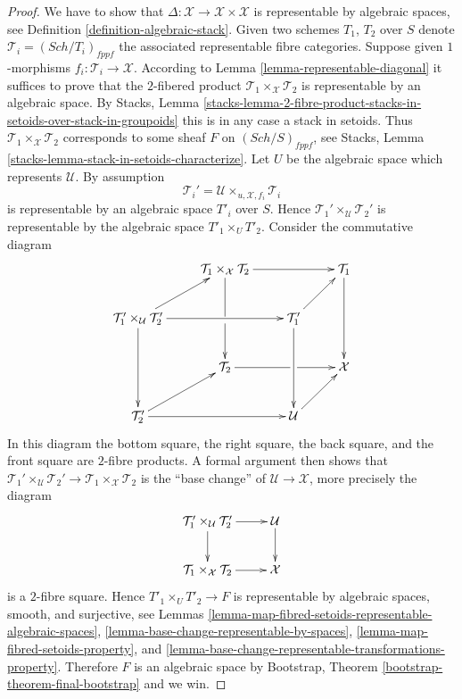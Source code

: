 \documentclass{stacks-project}
\theoremstyle{plain}
\theoremstyle{definition}
\theoremstyle{remark}
\numberwithin{equation}{subsection}
\def\Sch{\mathit{Sch}}
\begin{document}
\begin{proof}
We have to show that $\Delta : \mathcal{X} \to \mathcal{X} \times \mathcal{X}$
is representable by algebraic spaces, see
Definition \ref{definition-algebraic-stack}.
Given two schemes $T_1$, $T_2$ over $S$ denote
$\mathcal{T}_i = (\Sch/T_i)_{fppf}$ the associated representable
fibre categories. Suppose given $1$-morphisms
$f_i : \mathcal{T}_i \to \mathcal{X}$.
According to
Lemma \ref{lemma-representable-diagonal}
it suffices to prove that the $2$-fibered
product $\mathcal{T}_1 \times_\mathcal{X} \mathcal{T}_2$
is representable by an algebraic space. By
Stacks, Lemma
\ref{stacks-lemma-2-fibre-product-stacks-in-setoids-over-stack-in-groupoids}
this is in any case a stack in setoids. Thus
$\mathcal{T}_1 \times_\mathcal{X} \mathcal{T}_2$ corresponds
to some sheaf $F$ on $(\Sch/S)_{fppf}$, see
Stacks, Lemma \ref{stacks-lemma-stack-in-setoids-characterize}.
Let $U$ be the algebraic space which represents $\mathcal{U}$.
By assumption
$$
\mathcal{T}_i' = \mathcal{U} \times_{u, \mathcal{X}, f_i} \mathcal{T}_i
$$
is representable by an algebraic space $T'_i$ over $S$. Hence
$\mathcal{T}_1' \times_\mathcal{U} \mathcal{T}_2'$ is representable
by the algebraic space $T'_1 \times_U T'_2$.
Consider the commutative diagram
$$
\xymatrix{
&
\mathcal{T}_1 \times_{\mathcal X} \mathcal{T}_2 \ar[rr]\ar'[d][dd] & &
\mathcal{T}_1 \ar[dd] \\
\mathcal{T}_1' \times_\mathcal{U} \mathcal{T}_2' \ar[ur]\ar[rr]\ar[dd] & &
\mathcal{T}_1' \ar[ur]\ar[dd] \\
&
\mathcal{T}_2 \ar'[r][rr] & &
\mathcal X \\
\mathcal{T}_2' \ar[rr]\ar[ur] & &
\mathcal{U} \ar[ur] }
$$
In this diagram the bottom square, the right square, the back square, and
the front square are $2$-fibre products. A formal argument then shows
that $\mathcal{T}_1' \times_\mathcal{U} \mathcal{T}_2' \to
\mathcal{T}_1 \times_{\mathcal X} \mathcal{T}_2$
is the ``base change'' of $\mathcal{U} \to \mathcal{X}$, more precisely
the diagram
$$
\xymatrix{
\mathcal{T}_1' \times_\mathcal{U} \mathcal{T}_2' \ar[d] \ar[r] &
\mathcal{U} \ar[d] \\
\mathcal{T}_1 \times_{\mathcal X} \mathcal{T}_2 \ar[r] &
\mathcal{X}
}
$$
is a $2$-fibre square.
Hence $T'_1 \times_U T'_2 \to F$ is representable by algebraic spaces,
smooth, and surjective, see
Lemmas \ref{lemma-map-fibred-setoids-representable-algebraic-spaces},
\ref{lemma-base-change-representable-by-spaces},
\ref{lemma-map-fibred-setoids-property}, and
\ref{lemma-base-change-representable-transformations-property}.
Therefore $F$ is an algebraic space by
Bootstrap, Theorem \ref{bootstrap-theorem-final-bootstrap}
and we win.
\end{proof}
\end{document}

